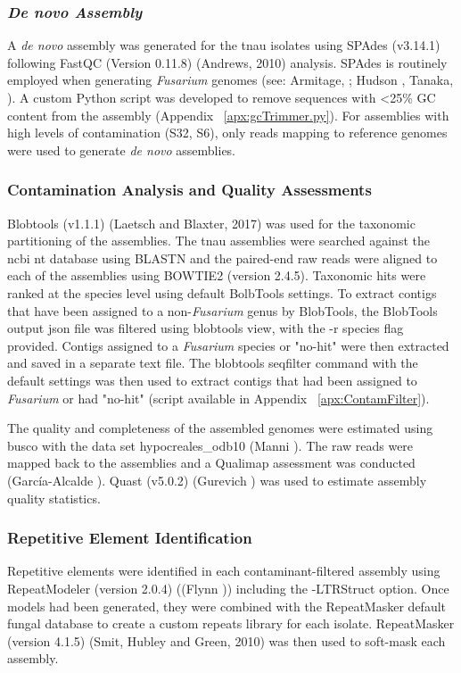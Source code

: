 \subsubsection{\textit{De novo Assembly}}
A \textit{de novo} assembly was generated for the \ac{tnau} isolates using SPAdes (v3.14.1) following FastQC (Version 0.11.8) (Andrews, 2010) analysis. SPAdes is routinely employed when generating \textit{Fusarium} genomes (see: Armitage, ; Hudson , Tanaka, ). A custom Python script was developed to remove sequences with <25\% GC content from the assembly (Appendix ~\ref{apx:gcTrimmer.py}). For assemblies with high levels of contamination (S32, S6), only reads mapping to reference genomes were used to generate \textit{de novo} assemblies.

\subsubsection{Contamination Analysis and Quality Assessments}
Blobtools (v1.1.1) (Laetsch and Blaxter, 2017) was used for the taxonomic partitioning of the assemblies. The \ac{tnau} assemblies were searched against the \ac{ncbi} nt database using BLASTN and the paired-end raw reads were aligned to each of the assemblies using BOWTIE2 (version 2.4.5). Taxonomic hits were ranked at the species level using default BolbTools settings. To extract contigs that have been assigned to a non-\textit{Fusarium} genus by BlobTools, the BlobTools output json file was filtered using blobtools view, with the -r species flag provided. Contigs assigned to a \textit{Fusarium} species or "no-hit" were then extracted and saved in a separate text file. The blobtools seqfilter command with the default settings was then used to extract contigs that had been assigned to \textit{Fusarium} or had "no-hit" (script available in Appendix ~\ref{apx:ContamFilter}).

The quality and completeness of the assembled genomes were estimated using \ac{busco} with the data set hypocreales\_odb10 (Manni ). The raw reads were mapped back to the assemblies and a Qualimap assessment was conducted (García-Alcalde ). Quast (v5.0.2) (Gurevich ) was used to estimate assembly quality statistics. 

\subsubsection{Repetitive Element Identification}

Repetitive elements were identified in each contaminant-filtered assembly using RepeatModeler (version 2.0.4) ((Flynn )) including the -LTRStruct option. Once models had been generated, they were combined with the RepeatMasker default fungal database to create a custom repeats library for each isolate. RepeatMasker (version 4.1.5) (Smit, Hubley and Green, 2010) was then used to soft-mask each assembly. 

